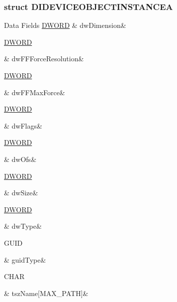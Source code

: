 \subsubsection{struct D\-I\-D\-E\-V\-I\-C\-E\-O\-B\-J\-E\-C\-T\-I\-N\-S\-T\-A\-N\-C\-E\-A}
\begin{DoxyFields}{Data Fields}
\hypertarget{a00003_a7799789c487a6df022d2aeb2a2652ad6}{\hyperlink{a00003_a50e15ae51c87ae06ab29c8148cb5f36c}{D\-W\-O\-R\-D}}\label{a00003_a7799789c487a6df022d2aeb2a2652ad6}
&
dw\-Dimension&
\\
\hline

\hypertarget{a00003_ad6eb00ae9357c8f79b5371d61bddc24e}{\hyperlink{a00003_a50e15ae51c87ae06ab29c8148cb5f36c}{D\-W\-O\-R\-D}}\label{a00003_ad6eb00ae9357c8f79b5371d61bddc24e}
&
dw\-F\-F\-Force\-Resolution&
\\
\hline

\hypertarget{a00003_ac3494e65997fbaa4212eeccb1146cada}{\hyperlink{a00003_a50e15ae51c87ae06ab29c8148cb5f36c}{D\-W\-O\-R\-D}}\label{a00003_ac3494e65997fbaa4212eeccb1146cada}
&
dw\-F\-F\-Max\-Force&
\\
\hline

\hypertarget{a00003_a4d2f405b1141000eb2af256e0fc8b98b}{\hyperlink{a00003_a50e15ae51c87ae06ab29c8148cb5f36c}{D\-W\-O\-R\-D}}\label{a00003_a4d2f405b1141000eb2af256e0fc8b98b}
&
dw\-Flags&
\\
\hline

\hypertarget{a00003_a2f0da10f0bff2a910138cc1b5715cdd5}{\hyperlink{a00003_a50e15ae51c87ae06ab29c8148cb5f36c}{D\-W\-O\-R\-D}}\label{a00003_a2f0da10f0bff2a910138cc1b5715cdd5}
&
dw\-Ofs&
\\
\hline

\hypertarget{a00003_a669c5a85f5a9eb97e64ad880fadaaa2d}{\hyperlink{a00003_a50e15ae51c87ae06ab29c8148cb5f36c}{D\-W\-O\-R\-D}}\label{a00003_a669c5a85f5a9eb97e64ad880fadaaa2d}
&
dw\-Size&
\\
\hline

\hypertarget{a00003_a81f5eff8d90c90eabc4c9a97d3ea7142}{\hyperlink{a00003_a50e15ae51c87ae06ab29c8148cb5f36c}{D\-W\-O\-R\-D}}\label{a00003_a81f5eff8d90c90eabc4c9a97d3ea7142}
&
dw\-Type&
\\
\hline

\hypertarget{a00003_aea5d3a608916b9ac856b773042e5051a}{G\-U\-I\-D}\label{a00003_aea5d3a608916b9ac856b773042e5051a}
&
guid\-Type&
\\
\hline

\hypertarget{a00003_a4b0a3dc31e4378c7de85eaa6654bcabb}{C\-H\-A\-R}\label{a00003_a4b0a3dc31e4378c7de85eaa6654bcabb}
&
tsz\-Name\mbox{[}M\-A\-X\-\_\-\-P\-A\-T\-H\mbox{]}&
\\
\hline


\end{DoxyFields}
